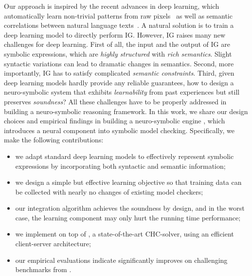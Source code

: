 
Our approach is inspired by the recent advances in deep learning, which automatically learn non-trivial patterns from raw pixels~\cite{Krizhevsky:nips12} as well as semantic correlations between natural language texts~\cite{Mikolov:nips13}.
A natural solution is to train a deep learning model to directly perform IG. 
However, IG raises many new challenges for deep learning. 
First of all, the input and the output of IG are symbolic expressions, which are \textit{highly structured} with \textit{rich semantics}. 
Slight syntactic variations can lead to dramatic changes in semantics.
Second, more importantly, IG has to satisfy complicated \textit{semantic constraints}. 
Third, given deep learning models hardly provide any reliable guarantees, how to design a neuro-symbolic system that exhibits \textit{learnability} from past experiences but still preserves \textit{soundness}?
All these challenges have to be properly addressed in building a neuro-symbolic reasoning framework. 
In this work, we share our design choices and empirical findings in building a neuro-symbolic engine \dpy, which introduces a neural component into symbolic model checking. 
Specifically, we make the following contributions: 
\begin{itemize}
    \item we adapt standard deep learning models to effectively represent symbolic expressions by incorporating both syntactic and semantic information;
    \item we design a simple but effective learning objective so that training data can be collected with nearly no changes of existing model checkers; 
    \item our integration algorithm achieves the soundness by design, and in the worst case, the learning component may only hurt the running time performance; 
    \item we implement \dpy on top of \spc, a state-of-the-art CHC-solver, using an efficient client-server architecture;
    \item our empirical evaluations indicate \dpy significantly improves \spc on 
    challenging benchmarks from \chccomp.
\end{itemize}

